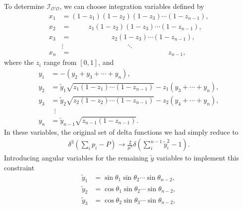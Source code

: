 \begin{subappendices}
To determine $\mathcal{I}_{\mathcal{O'}\mathcal{O}}$, we can choose integration 
variables defined by 
\begin{equation}
    \begin{aligned}
        x_1 &= (1-z_1)(1-z_2)(1-z_3) \dotsb (1-z_{n-1}), \\
        x_2 &= \quad\quad\,\,\, z_1(1-z_2)(1-z_3) \dotsb (1-z_{n-1}), \\
        x_3 &= \quad\quad\,\,\, \quad\quad\quad\,\, z_2(1-z_3) \dotsb (1-z_{n-1}), \\
        &\vdots \quad\quad\quad\quad\quad\quad\quad\quad\quad \ddots \\
        x_n &= \quad\quad\quad\quad\quad\quad\quad\quad\quad\quad\quad\quad\quad\quad z_{n-1}, \label{xtrans}
    \end{aligned}
\end{equation} 
where the $z_i$ range from $[0, 1]$, and 
\begin{equation}
    \begin{aligned}
        y_1 &= -(y_2+ y_3 + \dotsb + y_n), \\
        y_2 &= \tilde{y}_1 \sqrt{z_1(1-z_1) \dotsb (1-z_{n-1})} - z_1(y_3 + \dotsb + y_n), \\
        y_3 &= \tilde{y}_2 \sqrt{z_2(1-z_2) \dotsb (1-z_{n-1})} - z_2(y_4 + \dotsb + y_n), \\
        & \, \, \, \vdots\\
        y_n &= \tilde{y}_{n-1} \sqrt{z_{n-1}(1-z_{n-1})}. \label{ytrans}
    \end{aligned}
\end{equation} 
In these variables, the original set of delta functions we had simply reduce to 
\begin{equation}
    \begin{aligned}
        \delta^3\left(\sum_i p_i - P \right) \to \frac{2}{\mu^3} \delta \left( \sum_i^{n-1} \tilde{y}_i^2 - 1 \right).
    \end{aligned}
\end{equation} 
Introducing angular variables for the remaining $\tilde{y}$ variables to 
implement this constraint 
\begin{equation}
    \begin{aligned}
        \tilde{y}_1 &= \sin \theta_1 \sin \theta_2 \dotsb \sin \theta_{n-2}, \\
        \tilde{y}_2 &= \cos \theta_1 \sin \theta_2 \dotsb \sin \theta_{n-2}, \\
        \tilde{y}_3 &= \cos \theta_2 \sin \theta_3 \dotsb \sin \theta_{n-2}, \\

\end{aligned}
\end{equation}
\end{subappendices}
